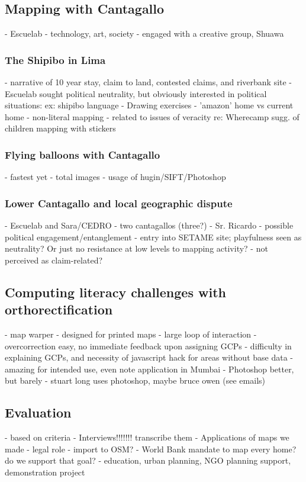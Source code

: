 \documentclass[11pt]{report}
\begin{document}
\subsection{Mapping with Cantagallo}
            - Escuelab - technology, art, society
            - engaged with a creative group, Shuawa
\subsubsection{The Shipibo in Lima}
            - narrative of 10 year stay, claim to land, contested claims, and riverbank site
            - Escuelab sought political neutrality, but obviously interested in political situations: ex: shipibo language            - Drawing exercises
                - 'amazon' home vs current home
                - non-literal mapping - related to issues of veracity re: Wherecamp sugg. of children mapping with stickers
\subsubsection{Flying balloons with Cantagallo}
- fastest yet
                - total images
                - usage of hugin/SIFT/Photoshop
\subsubsection{Lower Cantagallo and local geographic dispute}
            - Escuelab and Sara/CEDRO
	- two cantagallos (three?)
            - Sr. Ricardo - possible political engagement/entanglement
            - entry into SETAME site; playfulness seen as neutrality? Or just no resistance at low levels to mapping activity?
                - not perceived as claim-related?
\subsection{Computing literacy challenges with orthorectification}
	- map warper
        - designed for printed maps
        - large loop of interaction - overcorrection easy, no immediate feedback upon assigning GCPs
        - difficulty in explaining GCPs, and necessity of javascript hack for areas without base data
        - amazing for intended use, even note application in Mumbai
    - Photoshop better, but barely
	- stuart long uses photoshop, maybe bruce owen (see emails)
\subsection{Evaluation}
- based on criteria
        - Interviews!!!!!!! transcribe them
        - Applications of maps we made
            - legal role
            - import to OSM?
            - World Bank mandate to map every home? do we support that goal?
            - education, urban planning, NGO planning support, demonstration project
\end{document}
